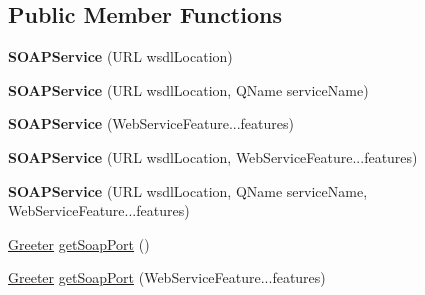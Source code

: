 \subsection*{Public Member Functions}
\begin{DoxyCompactItemize}
\item 
\hypertarget{classorg_1_1apache_1_1hello__world__soap__http_1_1_s_o_a_p_service_ac8a48d3c79e5643c7d32bb1f4b569d8b}{}{\bfseries S\+O\+A\+P\+Service} (U\+R\+L wsdl\+Location)\label{classorg_1_1apache_1_1hello__world__soap__http_1_1_s_o_a_p_service_ac8a48d3c79e5643c7d32bb1f4b569d8b}

\item 
\hypertarget{classorg_1_1apache_1_1hello__world__soap__http_1_1_s_o_a_p_service_a4dab9c0dc60031f40a03fbbe840ed5e1}{}{\bfseries S\+O\+A\+P\+Service} (U\+R\+L wsdl\+Location, Q\+Name service\+Name)\label{classorg_1_1apache_1_1hello__world__soap__http_1_1_s_o_a_p_service_a4dab9c0dc60031f40a03fbbe840ed5e1}

\item 
\hypertarget{classorg_1_1apache_1_1hello__world__soap__http_1_1_s_o_a_p_service_ad7870db7d8809aa0397b5680bd6b6b02}{}{\bfseries S\+O\+A\+P\+Service} (Web\+Service\+Feature...\+features)\label{classorg_1_1apache_1_1hello__world__soap__http_1_1_s_o_a_p_service_ad7870db7d8809aa0397b5680bd6b6b02}

\item 
\hypertarget{classorg_1_1apache_1_1hello__world__soap__http_1_1_s_o_a_p_service_a3031cca91299b8f06cfc85545eb4e54e}{}{\bfseries S\+O\+A\+P\+Service} (U\+R\+L wsdl\+Location, Web\+Service\+Feature...\+features)\label{classorg_1_1apache_1_1hello__world__soap__http_1_1_s_o_a_p_service_a3031cca91299b8f06cfc85545eb4e54e}

\item 
\hypertarget{classorg_1_1apache_1_1hello__world__soap__http_1_1_s_o_a_p_service_a87070f11a38efc1964429f5cdb38a40c}{}{\bfseries S\+O\+A\+P\+Service} (U\+R\+L wsdl\+Location, Q\+Name service\+Name, Web\+Service\+Feature...\+features)\label{classorg_1_1apache_1_1hello__world__soap__http_1_1_s_o_a_p_service_a87070f11a38efc1964429f5cdb38a40c}

\item 
\hyperlink{interfaceorg_1_1apache_1_1hello__world__soap__http_1_1_greeter}{Greeter} \hyperlink{classorg_1_1apache_1_1hello__world__soap__http_1_1_s_o_a_p_service_a45b4e33fe293560a551cc0515bb3c22a}{get\+Soap\+Port} ()
\item 
\hyperlink{interfaceorg_1_1apache_1_1hello__world__soap__http_1_1_greeter}{Greeter} \hyperlink{classorg_1_1apache_1_1hello__world__soap__http_1_1_s_o_a_p_service_adc384c275a89c811740e3bc18d4c2d37}{get\+Soap\+Port} (Web\+Service\+Feature...\+features)
\end{DoxyCompactItemize}

